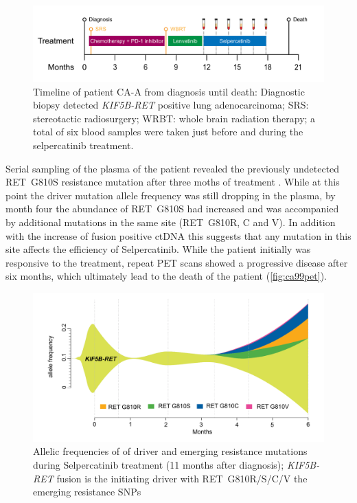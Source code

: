\begin{figure}[!ht]
\centering
\includegraphics[width=.99\linewidth]{Figures/CA-A_timeline}
\caption[Timeline of patient CA-A from diagnosis until death]{Timeline of patient CA-A from diagnosis until death: Diagnostic biopsy detected \textit{KIF5B-RET} positive lung adenocarcinoma; SRS: stereotactic radiosurgery; WRBT: whole brain radiation therapy; a total of six blood samples were taken just before and during the selpercatinib treatment.} \label{fig:ca99timeline}
\end{figure}


Serial sampling of the plasma of the patient revealed the previously undetected RET~G810S resistance mutation after three moths of treatment . While at this point the driver mutation allele frequency was still dropping in the plasma, by month four the abundance of RET~G810S had increased and was accompanied by additional mutations in the same site (RET~G810R, C and V). In addition with the increase of fusion positive ctDNA this suggests that any mutation in this site affects the efficiency of Selpercatinib. While the patient initially was responsive to the treatment, repeat PET scans showed a progressive disease after six months, which ultimately lead to the death of the patient (\autoref{fig:ca99pet}).

\begin{figure}[!ht]
\centering
\includegraphics[width=.99\linewidth]{Figures/CA-A_ctDNAstream}
\caption[Allelic frequencies of of driver and emerging resistance mutations]{Allelic frequencies of of driver and emerging resistance mutations during Selpercatinib treatment (11 months after diagnosis); \textit{KIF5B-RET} fusion is the initiating driver with RET~G810R/S/C/V the emerging resistance SNPs} \label{fig:ca99ctDNA}
\end{figure}


